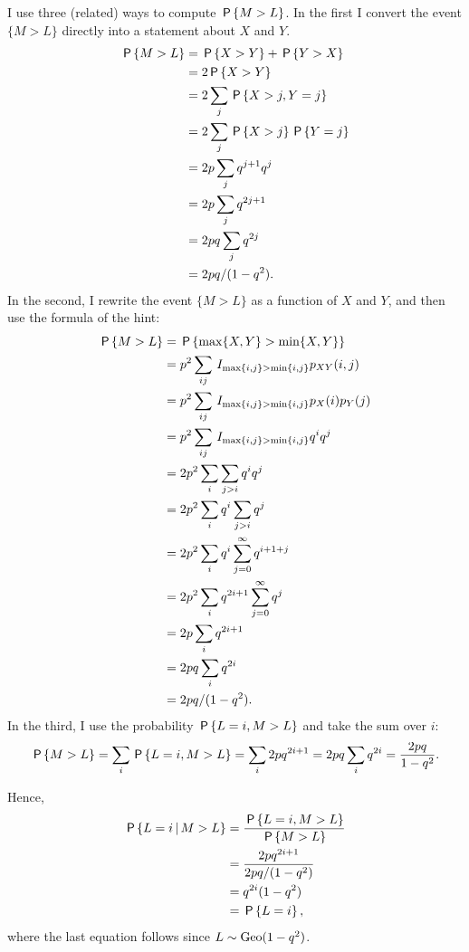\documentclass[a4paper,11pt]{article}
\begin{document}
\begin{exercise}
\begin{solution}
I use three (related) ways to compute $\P{M>L}$. In the first I convert the event $\{M>L\}$ directly into a statement about $X$ and $Y$.
\begin{align}
  \label{eq:3}
\P{M>L}
&= \P{X>Y} + \P{Y > X} \\
&= 2\P{X>Y} \\
&= 2\sum_{j} \P{X>j,Y=j} \\
&= 2\sum_{j}  \P{X>j}\P{Y=j} \\
&= 2p\sum_{j} q^{j+1} q^j\\
&= 2p\sum_{j} q^{2j+1}\\
&= 2pq\sum_{j} q^{2j}\\
&= 2pq/(1-q^2).
\end{align}
In the second,  I rewrite the event $\{M>L\}$ as a function of $X$ and $Y$, and then use  the formula of the hint:
\begin{align}
  \label{eq:4}
\P{M>L}  &= \P{\max\{X, Y\} > \min\{X,Y\}} \\
&=p^2\sum_{ij}\1{\max\{i, j\} > \min\{i, j\}} p_{X Y}(i,j) \\
&=p^2\sum_{ij}\1{\max\{i, j\} > \min\{i, j\}} p_{X}(i)p_{Y}(j) \\
&=p^2\sum_{ij}\1{\max\{i, j\} > \min\{i, j\}} q^i q^j \\
&=2p^2\sum_{i}\sum_{j>i} q^i q^j \\
&=2p^2\sum_{i}q^i \sum_{j>i} q^j \\
&=2p^2\sum_{i}q^i \sum_{j=0}^\infty q^{i+1+j} \\
&=2p^2\sum_{i}q^{2i+1} \sum_{j=0}^\infty q^{j} \\
&=2p\sum_{i}q^{2i+1} \\
&=2pq\sum_{i}q^{2i} \\
&=2pq/(1-q^2).
\end{align}
In the third, I use the probability $\P{L=i, M>L}$ and take the sum over $i$:
\begin{align}
  \label{eq:48}
\P{M>L} = \sum_{i} \P{L=i, M>L}  = \sum_{i} 2pq^{2i+1} = 2pq\sum_{i} q^{2i} = \frac{2pq}{1-q^{2}}.
\end{align}

Hence,
\begin{align}
\P{L=i\given M > L}
&=\frac{\P{L=i, M > L}}{\P{M>L}} \\
&=\frac{2p q^{2i+1}}{2pq/(1-q^2)} \\
&=q^{2i}(1-q^2) \\
&= \P{L=i},
\end{align}
where the last equation follows since $L\sim \Geo{1-q^2}$.

\end{solution}
\end{exercise}
\end{document}
